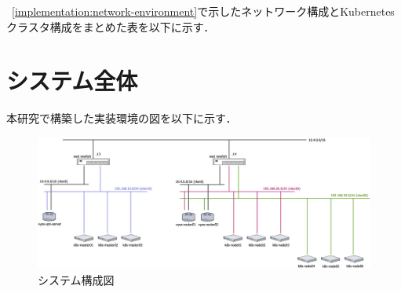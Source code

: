 ~\ref{implementation:network-environment}で示したネットワーク構成とKubernetesクラスタ構成をまとめた表を以下に示す．

\section{システム全体}
\label{implementation:system}
本研究で構築した実装環境の図を以下に示す．

\begin{figure}[htbp]
  \begin{center}
    \includegraphics[width=\textwidth]{./figures/system-diagram.jpg}
    \caption{システム構成図}
  \end{center}
\end{figure}

